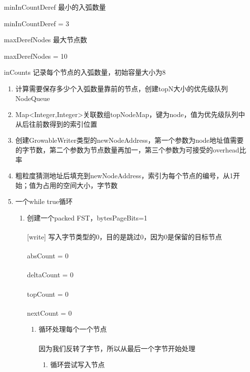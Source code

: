 \documentclass{article}
\begin{document}
minInCountDeref 最小的入弧数量

minInCountDeref = 3

maxDerefNodes 最大节点数

maxDerefNodes = 10

inCounts 记录每个节点的入弧数量，初始容量大小为8

\begin{enumerate}
	\item 计算需要保存多少个入弧数量靠前的节点，创建topN大小的优先级队列NodeQueue
	\item Map<Integer,Integer>关联数组topNodeMap，键为node，值为优先级队列中从后往前数得到的索引位置
	\item 创建GrowableWriter类型的newNodeAddress，第一个参数为node地址值需要的字节数，第二个参数为节点数量再加一，第三个参数为可接受的overhead比率
	\item 粗粒度猜测地址后填充到newNodeAddress，索引为每个节点的编号，从1开始；值为占用的空间大小，字节数
	\item 一个while true循环
	\begin{enumerate}
		\item 创建一个packed FST，bytesPageBits=1
			\paragraph{}
			[write] 写入字节类型的0，目的是跳过0，因为0是保留的目标节点
			\paragraph{}
			absCount = 0
			\paragraph{}
			deltaCount = 0
			\paragraph{}
			topCount = 0
			\paragraph{}
			nextCount = 0
			\begin{enumerate}
				\item 循环处理每个一个节点
					\paragraph{}
					因为我们反转了字节，所以从最后一个字节开始处理
					\begin{enumerate}
						\item 循环尝试写入节点

\end{enumerate}
\end{enumerate}
\end{enumerate}
\end{enumerate}
\end{document}
